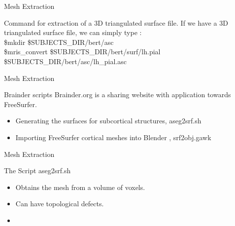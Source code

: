 \documentclass{beamer}
\begin{document}
\begin{frame}{Mesh Extraction}
\begin{block}{Command for extraction of a 3D triangulated surface file.}
If we have a 3D triangulated surface file, we can simply type : \\ 
\small{
 \$mkdir \$SUBJECTS\_DIR/bert/asc    \\
\$mris\_convert \$SUBJECTS\_DIR/bert/surf/lh.pial  \\ \hspace{3cm} \$SUBJECTS\_DIR/bert/asc/lh\_pial.asc 
}
\end{block}
\end{frame}

\begin{frame}{Mesh Extraction}
\begin{block}{Brainder scripts}
Brainder.org is a sharing website with application towards FreeSurfer.
\begin{itemize}
\item<2-> Generating the surfaces for subcortical structures, aseg2srf.sh 
\item<3-> Importing FreeSurfer cortical meshes into Blender , srf2obj.gawk 
\end{itemize}
\end{block}
\end{frame}

\begin{frame}{Mesh Extraction}
\begin{block}{The Script aseg2srf.sh}
\begin{itemize}
\item<2-> Obtains the mesh from a volume of voxels. 
\item<3-> Can have topological defects.
\item<4->  \href{run:./Files/aseg2srf.sh}{}
\end{itemize}
\end{block}
\end{frame}


%
%
\end{document}
